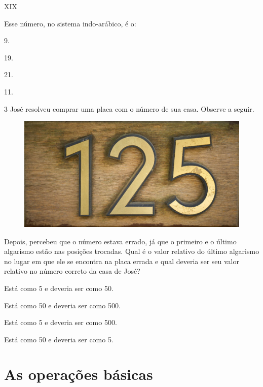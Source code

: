 \begin{myquote}
XIX
\end{myquote}

Esse número, no sistema indo-arábico, é o:

\begin{escolha}
\item
  9.
\item
  19.
\item
  21.
\item
  11.
\end{escolha}

\pagebreak
\num{3} José resolveu comprar uma placa com o número de sua casa. Observe a seguir.

\begin{figure}[htpb!]
\centering
\includegraphics[width=\textwidth]{media/image9.png}
\end{figure}

Depois, percebeu que o número estava
errado, já que o primeiro e o último algarismo estão nas posições
trocadas. Qual é o valor relativo do último algarismo no lugar em que ele se
encontra na placa errada e qual deveria ser seu valor relativo no número
correto da casa de José?

\begin{escolha}
\item
  Está como 5 e deveria ser como 50.
\item
  Está como 50 e deveria ser como 500.
\item
  Está como 5 e deveria ser como 500.
\item
  Está como 50 e deveria ser como 5.
\end{escolha}

\chapter{As operações básicas}

